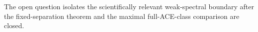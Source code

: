 The open question isolates the scientifically relevant weak-spectral boundary after the fixed-separation theorem and the maximal full-ACE-class comparison are closed.